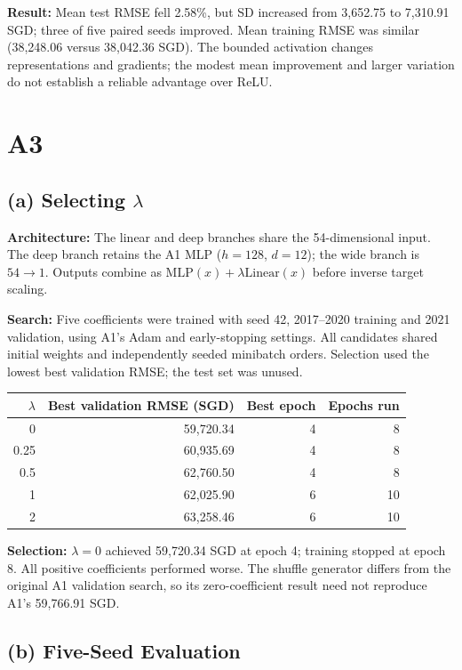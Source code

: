\documentclass[10pt,a4paper]{article}
\begin{document}
\textbf{Result:} Mean test RMSE fell 2.58\%, but SD increased from 3,652.75 to 7,310.91 SGD; three of five paired seeds improved. Mean training RMSE was similar (38,248.06 versus 38,042.36 SGD). The bounded activation changes representations and gradients; the modest mean improvement and larger variation do not establish a reliable advantage over ReLU.
\section*{A3}
\subsection*{(a) Selecting $\lambda$}

\textbf{Architecture:} The linear and deep branches share the 54-dimensional input. The deep branch retains the A1 MLP ($h=128$, $d=12$); the wide branch is $54\to1$. Outputs combine as $\mathrm{MLP}(x)+\lambda\mathrm{Linear}(x)$ before inverse target scaling.

\textbf{Search:} Five coefficients were trained with seed 42, 2017--2020 training and 2021 validation, using A1's Adam and early-stopping settings. All candidates shared initial weights and independently seeded minibatch orders. Selection used the lowest best validation RMSE; the test set was unused.
\begin{center}\small\begin{tabular}{rrrr}\toprule $\lambda$ & Best validation RMSE (SGD)&Best epoch&Epochs run\\\midrule
0 & 59,720.34 & 4 & 8 \\
0.25 & 60,935.69 & 4 & 8 \\
0.5 & 62,760.50 & 4 & 8 \\
1 & 62,025.90 & 6 & 10 \\
2 & 63,258.46 & 6 & 10 \\
\bottomrule\end{tabular}\end{center}

\textbf{Selection:} $\lambda=0$ achieved 59,720.34 SGD at epoch 4; training stopped at epoch 8. All positive coefficients performed worse. The shuffle generator differs from the original A1 validation search, so its zero-coefficient result need not reproduce A1's 59,766.91 SGD.
\subsection*{(b) Five-Seed Evaluation}
\end{document}
